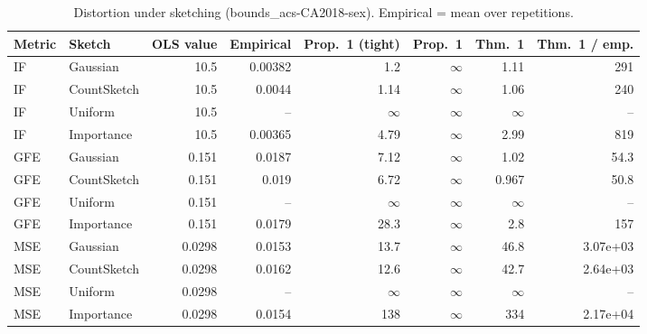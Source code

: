 \begin{table}[t]
\centering
\small
\begin{tabular}{llrrrrrr}
\toprule
Metric & Sketch & OLS value & Empirical & Prop.~1 (tight) & Prop.~1 & Thm.~1 & Thm.~1 / emp. \\
\midrule
IF & Gaussian & 10.5 & 0.00382 & 1.2 & $\infty$ & 1.11 & 291 \\
IF & CountSketch & 10.5 & 0.0044 & 1.14 & $\infty$ & 1.06 & 240 \\
IF & Uniform & 10.5 & -- & $\infty$ & $\infty$ & $\infty$ & -- \\
IF & Importance & 10.5 & 0.00365 & 4.79 & $\infty$ & 2.99 & 819 \\
\midrule
GFE & Gaussian & 0.151 & 0.0187 & 7.12 & $\infty$ & 1.02 & 54.3 \\
GFE & CountSketch & 0.151 & 0.019 & 6.72 & $\infty$ & 0.967 & 50.8 \\
GFE & Uniform & 0.151 & -- & $\infty$ & $\infty$ & $\infty$ & -- \\
GFE & Importance & 0.151 & 0.0179 & 28.3 & $\infty$ & 2.8 & 157 \\
\midrule
MSE & Gaussian & 0.0298 & 0.0153 & 13.7 & $\infty$ & 46.8 & 3.07e+03 \\
MSE & CountSketch & 0.0298 & 0.0162 & 12.6 & $\infty$ & 42.7 & 2.64e+03 \\
MSE & Uniform & 0.0298 & -- & $\infty$ & $\infty$ & $\infty$ & -- \\
MSE & Importance & 0.0298 & 0.0154 & 138 & $\infty$ & 334 & 2.17e+04 \\
\bottomrule
\end{tabular}
\caption{Distortion under sketching (bounds_acs-CA2018-sex). Empirical = mean over repetitions.}
\label{tab:bounds_acs-CA2018-sex}
\end{table}